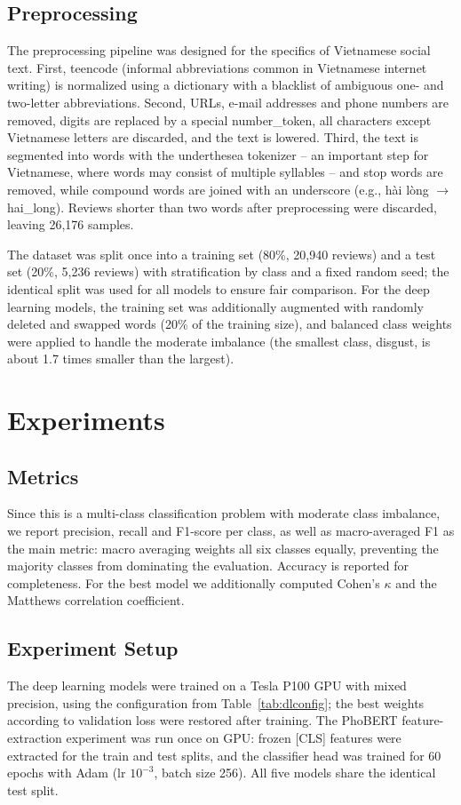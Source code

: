 \documentclass[11pt]{article}
\begin{document}
\subsection{Preprocessing}
The preprocessing pipeline was designed for the specifics of Vietnamese social text. First, teencode (informal abbreviations common in Vietnamese internet writing) is normalized using a dictionary with a blacklist of ambiguous one- and two-letter abbreviations. Second, URLs, e-mail addresses and phone numbers are removed, digits are replaced by a special number\_token, all characters except Vietnamese letters are discarded, and the text is lowered. Third, the text is segmented into words with the underthesea tokenizer -- an important step for Vietnamese, where words may consist of multiple syllables -- and stop words are removed, while compound words are joined with an underscore (e.g., h\`ai l\`ong $\to$ hai\_long). Reviews shorter than two words after preprocessing were discarded, leaving 26,176 samples.

The dataset was split once into a training set (80\%, 20,940 reviews) and a test set (20\%, 5,236 reviews) with stratification by class and a fixed random seed; the identical split was used for all models to ensure fair comparison. For the deep learning models, the training set was additionally augmented with randomly deleted and swapped words (20\% of the training size), and balanced class weights were applied to handle the moderate imbalance (the smallest class, disgust, is about 1.7 times smaller than the largest).

\section{Experiments}
\subsection{Metrics}
Since this is a multi-class classification problem with moderate class imbalance, we report precision, recall and F1-score per class, as well as macro-averaged F1 as the main metric: macro averaging weights all six classes equally, preventing the majority classes from dominating the evaluation. Accuracy is reported for completeness. For the best model we additionally computed Cohen's $\kappa$ and the Matthews correlation coefficient.

\subsection{Experiment Setup}
The deep learning models were trained on a Tesla P100 GPU with mixed precision, using the configuration from Table~\ref{tab:dlconfig}; the best weights according to validation loss were restored after training. The PhoBERT feature-extraction experiment was run once on GPU: frozen [CLS] features were extracted for the train and test splits, and the classifier head was trained for 60 epochs with Adam (lr $10^{-3}$, batch size 256). All five models share the identical test split.
\end{document}
